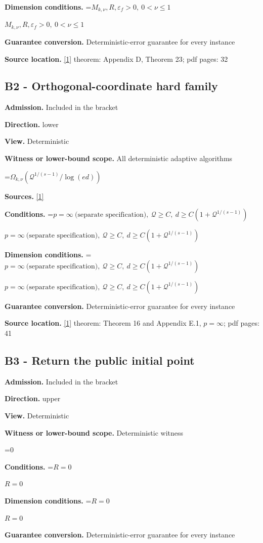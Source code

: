 \documentclass[10pt,a4paper]{article}
\newcommand{\AtlasMath}[1]{\par\begingroup\centering\setbox0=\hbox{$\displaystyle #1$}\ifdim\wd0>1.4\linewidth\typeout{ATLAS WIDE FORMULA: \the\wd0}\fi\ifdim\wd0>\linewidth\resizebox{\linewidth}{!}{\box0}\else\box0\fi\par\endgroup}
\newcommand{\AtlasInlineMath}[1]{\begingroup\setbox0=\hbox{$#1$}\ifdim\wd0>.4\linewidth\endgroup\AtlasMath{#1}\else\endgroup$#1$\fi}
\begin{document}
\textbf{Dimension conditions.} \AtlasInlineMath{M_{k,\nu},R,\varepsilon_f>0,\ 0<\nu\le1}

\textbf{Guarantee conversion.} Deterministic-error guarantee for every instance

\textbf{Source location.} \href{https://arxiv.org/pdf/2411.08987v2}{[1]} theorem: Appendix D, Theorem 23; pdf pages: 32

\subsection{B2 - Orthogonal-coordinate hard family}
\textbf{Admission.} Included in the bracket

\textbf{Direction.} lower

\textbf{View.} Deterministic

\textbf{Witness or lower-bound scope.} All deterministic adaptive algorithms

\AtlasMath{\Omega_{k,\nu}(\mathcal{Q}^{1/(s-1)}/\log(ed))}
\textbf{Sources.} \href{https://arxiv.org/pdf/2411.08987v2}{[1]}

\textbf{Conditions.} \AtlasInlineMath{p=\infty\ \text{(separate specification)},\ \mathcal{Q}\ge C,\ d\ge C(1+\mathcal{Q}^{1/(s-1)})}

\textbf{Dimension conditions.} \AtlasInlineMath{p=\infty\ \text{(separate specification)},\ \mathcal{Q}\ge C,\ d\ge C(1+\mathcal{Q}^{1/(s-1)})}

\textbf{Guarantee conversion.} Deterministic-error guarantee for every instance

\textbf{Source location.} \href{https://arxiv.org/pdf/2411.08987v2}{[1]} theorem: Theorem 16 and Appendix E.1, $p=\infty$; pdf pages: 41

\subsection{B3 - Return the public initial point}
\textbf{Admission.} Included in the bracket

\textbf{Direction.} upper

\textbf{View.} Deterministic

\textbf{Witness or lower-bound scope.} Deterministic witness

\AtlasMath{0}
\textbf{Conditions.} \AtlasInlineMath{R=0}

\textbf{Dimension conditions.} \AtlasInlineMath{R=0}

\textbf{Guarantee conversion.} Deterministic-error guarantee for every instance
\end{document}
